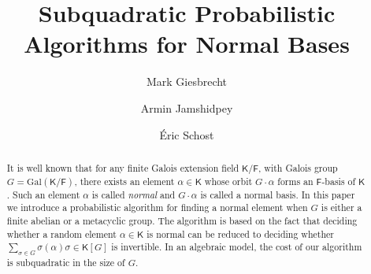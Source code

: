\documentclass[sigconf]{acmart}
\numberwithin{equation}{section}
\theoremstyle{acmplain}
\theoremstyle{acmplain}
\begin{document}
\title{Subquadratic Probabilistic Algorithms for Normal Bases}


\author{Mark Giesbrecht
}

\author{Armin Jamshidpey}

\author{\'Eric Schost}


\renewcommand{\shortauthors}{Giesbrecht, Jamshidpey, Schost}

\newcommand{\F}{{\mathsf{F}}}
\newcommand{\K}{{\mathsf{K}}}

\newcommand{\NN}{{\mathbb{N}}}
\newcommand{\N}{{\mathbb{N}}}

\def\A{\mathbb{A}}
\def\H{\mathbb{H}}
\def\B{\mathbb{B}}
\def\Z{\mathbb{Z}}
\def\C{\mathbb{C}}
\def\Q{\mathbb{Q}}
\def\D{\mathbb{D}}
\newcommand{\QQ}{\mathbb{Q}}
\newcommand{\mat}[1]{\mathbf{\MakeUppercase{#1}}} %

\begin{abstract}
  It is well known that for any finite Galois extension field $\K/\F$,
  with Galois group $G = \mathrm{Gal}(\K/\F)$, there exists an element
  $\alpha \in \K$ whose orbit $G\cdot\alpha$ forms an $\F$-basis of
  $\K$. Such an element $\alpha$ is called \emph{normal} and
  $G\cdot\alpha$ is called a normal basis. In this paper we introduce
  a probabilistic algorithm for finding a normal element when $G$ is
  either a finite abelian or a metacyclic group. The algorithm is
  based on the fact that deciding whether a random element $\alpha \in
  \K$ is normal can be reduced to deciding whether $\sum_{\sigma \in
    G} \sigma(\alpha)\sigma \in \K[G]$ is invertible. In an algebraic
  model, the cost of our algorithm is subquadratic in the size of $G$.
\end{abstract}
\end{document}
